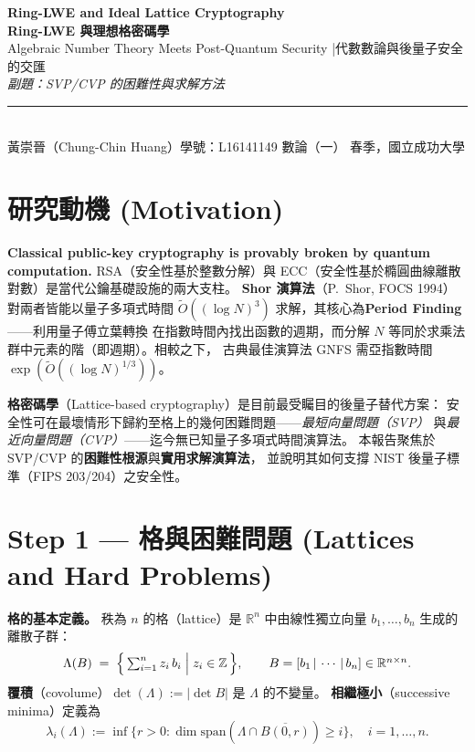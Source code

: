 \documentclass[12pt, a4paper]{article}
\begin{document}
\begin{center}
  {\LARGE\bfseries\color{accent}
    Ring-LWE and Ideal Lattice Cryptography}\\[4pt]
  {\large\bfseries Ring-LWE 與理想格密碼學}\\[2pt]
  {\normalsize Algebraic Number Theory Meets Post-Quantum Security
    \quad|\quad 代數數論與後量子安全的交匯}\\[2pt]
  {\normalsize\itshape\color{accent} 副題：SVP/CVP 的困難性與求解方法}\\[8pt]
  \rule{\linewidth}{0.8pt}\\[4pt]
  {\small 黃崇晉（Chung-Chin Huang）\quad 學號：L16141149
    \quad 數論（一） 春季，國立成功大學}
\end{center}

\vspace{4pt}

\section{研究動機 \small\normalfont\color{gray}(Motivation)}

\textbf{Classical public-key cryptography is provably broken by quantum computation.}
RSA（安全性基於整數分解）與 ECC（安全性基於橢圓曲線離散對數）是當代公鑰基礎設施的兩大支柱。
\textbf{Shor 演算法}（P.\ Shor, FOCS 1994）對兩者皆能以量子多項式時間
$\widetilde{O}((\log N)^3)$ 求解，其核心為\textbf{Period Finding}——利用量子傅立葉轉換
在指數時間內找出函數的週期，而分解 $N$ 等同於求乘法群中元素的階（即週期）。相較之下，
古典最佳演算法 GNFS 需亞指數時間 $\exp(\widetilde{O}((\log N)^{1/3}))$。

\textbf{格密碼學}（Lattice-based cryptography）是目前最受矚目的後量子替代方案：
安全性可在最壞情形下歸約至格上的幾何困難問題——\textit{最短向量問題（SVP）}
與\textit{最近向量問題（CVP）}——迄今無已知量子多項式時間演算法。
本報告聚焦於 SVP/CVP 的\textbf{困難性根源}與\textbf{實用求解演算法}，
並說明其如何支撐 NIST 後量子標準（FIPS 203/204）之安全性。

\section{Step 1 \;—\; 格與困難問題 \small\normalfont\color{gray}(Lattices and Hard Problems)}

\textbf{格的基本定義。}
秩為 $n$ 的格（lattice）是 $\mathbb{R}^n$ 中由線性獨立向量
$b_1,\ldots,b_n$ 生成的離散子群：
\[
  \Lambda(B) \;=\; \Bigl\{\,\textstyle\sum_{i=1}^n z_i\,b_i \;\Big|\; z_i\in\mathbb{Z}\,\Bigr\},
  \qquad B = [b_1\,|\,\cdots\,|\,b_n]\in\mathbb{R}^{n\times n}.
\]
\textbf{覆積}（covolume）$\det(\Lambda):=|\det B|$ 是 $\Lambda$ 的不變量。
\textbf{相繼極小}（successive minima）定義為
\[
  \lambda_i(\Lambda) := \inf\bigl\{r>0 :
    \dim\mathrm{span}(\Lambda\cap\overline{B(0,r)})\geq i\bigr\},\quad i=1,\ldots,n.
\]
\end{document}
